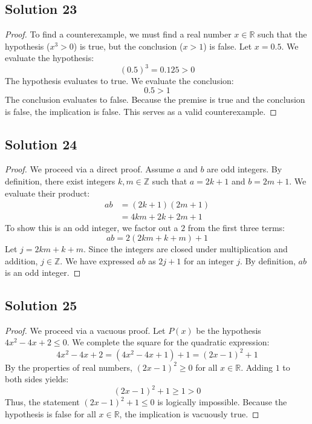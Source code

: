 \documentclass[12pt]{article}
\begin{document}
\subsection*{Solution 23}
\begin{proof}
To find a counterexample, we must find a real number $x \in \mathbb{R}$ such that the hypothesis ($x^3 > 0$) is true, but the conclusion ($x > 1$) is false. 
Let $x = 0.5$. 
We evaluate the hypothesis:
\[ (0.5)^3 = 0.125 > 0 \]
The hypothesis evaluates to true. 
We evaluate the conclusion:
\[ 0.5 > 1 \]
The conclusion evaluates to false. Because the premise is true and the conclusion is false, the implication is false. This serves as a valid counterexample.
\end{proof}

\subsection*{Solution 24}
\begin{proof}
We proceed via a direct proof. Assume $a$ and $b$ are odd integers. By definition, there exist integers $k, m \in \mathbb{Z}$ such that $a = 2k + 1$ and $b = 2m + 1$. We evaluate their product:
\begin{align*}
    ab &= (2k + 1)(2m + 1) \\
       &= 4km + 2k + 2m + 1
\end{align*}
To show this is an odd integer, we factor out a $2$ from the first three terms:
\[ ab = 2(2km + k + m) + 1 \]
Let $j = 2km + k + m$. Since the integers are closed under multiplication and addition, $j \in \mathbb{Z}$. We have expressed $ab$ as $2j + 1$ for an integer $j$. By definition, $ab$ is an odd integer.
\end{proof}

\subsection*{Solution 25}
\begin{proof}
We proceed via a vacuous proof. Let $P(x)$ be the hypothesis $4x^2 - 4x + 2 \le 0$. We complete the square for the quadratic expression:
\[ 4x^2 - 4x + 2 = (4x^2 - 4x + 1) + 1 = (2x - 1)^2 + 1 \]
By the properties of real numbers, $(2x - 1)^2 \ge 0$ for all $x \in \mathbb{R}$. Adding $1$ to both sides yields:
\[ (2x - 1)^2 + 1 \ge 1 > 0 \]
Thus, the statement $(2x - 1)^2 + 1 \le 0$ is logically impossible. Because the hypothesis is false for all $x \in \mathbb{R}$, the implication is vacuously true.
\end{proof}
\end{document}
